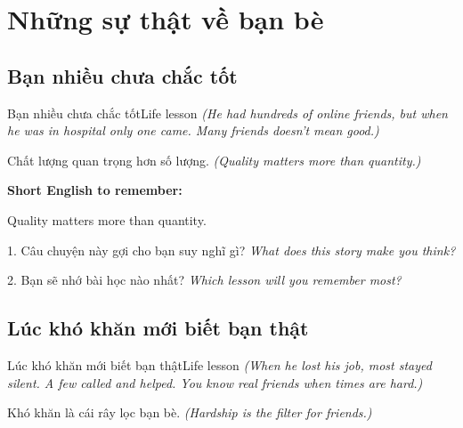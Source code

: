 \chapter{Những sự thật về bạn bè}


\section{Bạn nhiều chưa chắc tốt}
\begin{truyen}{Bạn nhiều chưa chắc tốt}{Life lesson}
\textit{(He had hundreds of online friends, but when he was in hospital only one came. Many friends doesn't mean good.)}
\end{truyen}

\begin{baihoc}
Chất lượng quan trọng hơn số lượng.
\textit{(Quality matters more than quantity.)}
\end{baihoc}

\begin{ghinhoanh}
\textbf{Short English to remember:}

Quality matters more than quantity.

\end{ghinhoanh}

\begin{tuhocnhanh}
1. Câu chuyện này gợi cho bạn suy nghĩ gì? \textit{What does this story make you think?}

2. Bạn sẽ nhớ bài học nào nhất? \textit{Which lesson will you remember most?}
\end{tuhocnhanh}
\ngancach


\section{Lúc khó khăn mới biết bạn thật}
\begin{truyen}{Lúc khó khăn mới biết bạn thật}{Life lesson}
\textit{(When he lost his job, most stayed silent. A few called and helped. You know real friends when times are hard.)}
\end{truyen}

\begin{baihoc}
Khó khăn là cái rây lọc bạn bè.
\textit{(Hardship is the filter for friends.)}
\end{baihoc}

